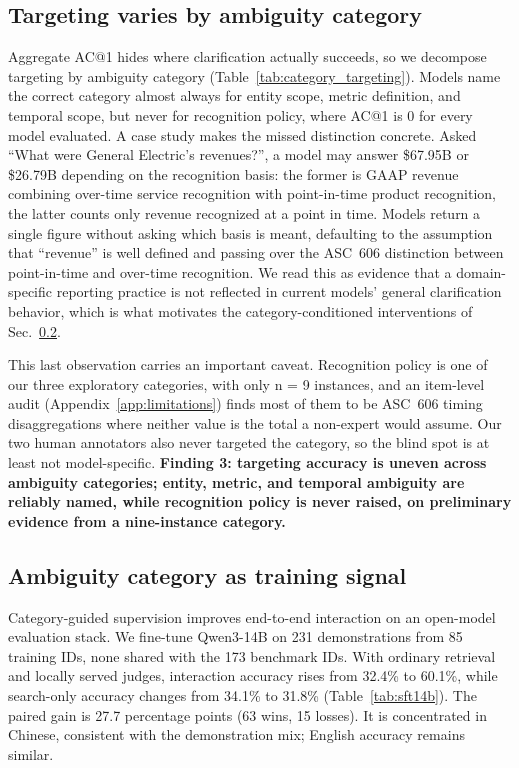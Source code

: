 \subsection{Targeting varies by ambiguity category}
\label{sec:skills}
Aggregate AC@1 hides where clarification actually succeeds, so we decompose targeting by ambiguity category (Table~\ref{tab:category_targeting}). Models name the correct category almost always for entity scope, metric definition, and temporal scope, but never for recognition policy, where AC@1 is 0 for every model evaluated. A case study makes the missed distinction concrete. Asked ``What were General Electric's revenues?'', a model may answer \$67.95B or \$26.79B depending on the recognition basis: the former is GAAP revenue combining over-time service recognition with point-in-time product recognition, the latter counts only revenue recognized at a point in time. Models return a single figure without asking which basis is meant, defaulting to the assumption that ``revenue'' is well defined and passing over the ASC~606 distinction between point-in-time and over-time recognition. We read this as evidence that a domain-specific reporting practice is not reflected in current models' general clarification behavior, which is what motivates the category-conditioned interventions of Sec.~\ref{sec:trainsignal}.

This last observation carries an important caveat. Recognition policy is one of our three exploratory categories, with only n = 9 instances, and an item-level audit (Appendix~\ref{app:limitations}) finds most of them to be ASC~606 timing disaggregations where neither value is the total a non-expert would assume. Our two human annotators also never targeted the category, so the blind spot is at least not model-specific. \textbf{Finding 3: targeting accuracy is uneven across ambiguity categories; entity, metric, and temporal ambiguity are reliably named, while recognition policy is never raised, on preliminary evidence from a nine-instance category.}

\subsection{Ambiguity category as training signal}
\label{sec:trainsignal}
Category-guided supervision improves end-to-end interaction on an open-model evaluation stack. We fine-tune Qwen3-14B on 231 demonstrations from 85 training IDs, none shared with the 173 benchmark IDs. With ordinary retrieval and locally served judges, interaction accuracy rises from 32.4\% to 60.1\%, while search-only accuracy changes from 34.1\% to 31.8\% (Table~\ref{tab:sft14b}). The paired gain is 27.7 percentage points (63 wins, 15 losses). It is concentrated in Chinese, consistent with the demonstration mix; English accuracy remains similar.


